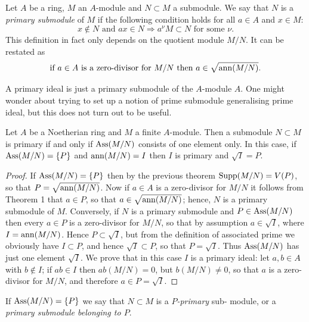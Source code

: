 \begin{definition}
Let $A$ be a ring, $M$ an $A$-module and $N \subset M$ a submodule. We
say that $N$ is a \emph{primary submodule} of $M$ if the following condition holds for
all $a \in A$ and $x \in M$:
\[
  x \notin N \text{ and } ax \in N \Rightarrow a^\nu M \subset N \text{ for some } \nu.
\]
This definition in fact only depends on the quotient module $M/N$. It can be
restated as
\[
  \text{if } a \in A \text{ is a zero-divisor for } M/N \text{ then } a \in \sqrt{\operatorname{ann}(M/N)}.
\]
\end{definition}

A primary ideal is just a primary submodule of the $A$-module $A$. One
might wonder about trying to set up a notion of prime submodule
generalising prime ideal, but this does not turn out to be useful.

\begin{theorem}\label{thm:6.6}
Let $A$ be a Noetherian ring and $M$ a finite $A$-module. Then a
submodule $N \subset M$ is primary if and only if $\operatorname{Ass}(M/N)$ consists of one
element only. In this case, if $\operatorname{Ass}(M/N) = \{P\}$ and $\operatorname{ann}(M/N) = I$ then $I$ is
primary and $\sqrt{I} = P$.
\end{theorem}

\begin{proof}
If $\operatorname{Ass}(M/N) = \{P\}$ then by the previous theorem $\operatorname{Supp}(M/N) =
V(P)$, so that $P = \sqrt{\operatorname{ann}(M/N)}$. Now if $a \in A$ is a zero-divisor for $M/N$ it
follows from Theorem 1 that $a \in P$, so that $a \in \sqrt{\operatorname{ann}(M/N)}$; hence, $N$ is a
primary submodule of $M$. Conversely, if $N$ is a primary submodule and
$P \in \operatorname{Ass}(M/N)$ then every $a \in P$ is a zero-divisor for $M/N$, so that by
assumption $a \in \sqrt{I}$, where $I = \operatorname{ann}(M/N)$. Hence $P \subset \sqrt{I}$, but from the
definition of associated prime we obviously have $I \subset P$, and hence $\sqrt{I} \subset P$,
so that $P = \sqrt{I}$. Thus $\operatorname{Ass}(M/N)$ has just one element $\sqrt{I}$. We prove that in
this case $I$ is a primary ideal: let $a, b \in A$ with $b \notin I$; if $ab \in I$ then $ab(M/N) = 0$,
but $b(M/N) \neq 0$, so that $a$ is a zero-divisor for $M/N$, and therefore
$a \in P = \sqrt{I}$.
\end{proof}

\begin{definition}
If $\operatorname{Ass}(M/N) = \{P\}$ we say that $N \subset M$ is a \emph{$P$-primary} sub-
module, or a \emph{primary submodule belonging to $P$}.
\end{definition}

